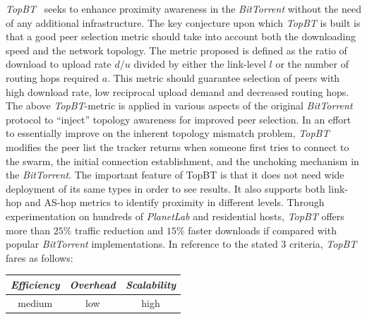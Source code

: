\emph{TopBT}~\cite{RTLCGZ2010} seeks to enhance 
proximity awareness in the {\sl BitTorrent}
without the need of any additional infrastructure. The key conjecture upon
which \emph{TopBT} is built is that
a good peer selection metric should take into account both the
downloading speed and the network topology. The metric proposed is defined as
the ratio of download to upload rate ${d}/{u}$
divided by either the link-level $l$ or the number of routing hops required $a$.
This metric should guarantee selection of peers with high download rate, low
reciprocal upload demand and decreased routing hops.
The above \emph{TopBT}-metric is applied in various
aspects of the original {\sl BitTorrent} protocol to ``inject'' topology
awareness for improved peer selection. 
In an effort to essentially improve on the inherent topology mismatch problem,
\emph{TopBT} modifies the peer list the tracker returns when someone first tries
to connect to the swarm, the initial connection establishment, and the
unchoking mechanism in the {\sl BitTorrent}. The important feature of TopBT is
that it does not need wide deployment of its same types in order to see results.
It also supports both link-hop and AS-hop metrics to identify proximity in
different levels.
%
Through experimentation on hundreds of {\it PlanetLab} and residential hosts,
\emph{TopBT} offers more than $25\%$ traffic reduction and $15\%$ faster downloads
if compared with popular {\sl BitTorrent} implementations.
In reference to the stated $3$ criteria, \emph{TopBT} fares as follows:
\begin{center}
{\footnotesize
\begin{tabular}{ccc}
\emph{Efficiency} & \emph{Overhead} & \emph{Scalability} \\
\hline
medium &
low &
high
\end{tabular}
}
\end{center}

